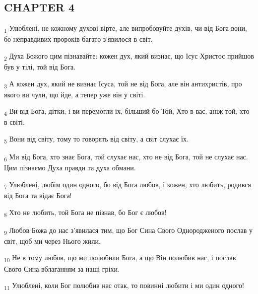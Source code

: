 \subsection{CHAPTER 4}
\begin{tcolorbox}
\textsubscript{1} Улюблені, не кожному духові вірте, але випробовуйте духів, чи від Бога вони, бо неправдивих пророків багато з'явилося в світ.
\end{tcolorbox}
\begin{tcolorbox}
\textsubscript{2} Духа Божого цим пізнавайте: кожен дух, який визнає, що Ісус Христос прийшов був у тілі, той від Бога.
\end{tcolorbox}
\begin{tcolorbox}
\textsubscript{3} А кожен дух, який не визнає Ісуса, той не від Бога, але він антихристів, про якого ви чули, що йде, а тепер уже він у світі.
\end{tcolorbox}
\begin{tcolorbox}
\textsubscript{4} Ви від Бога, дітки, і ви перемогли їх, більший бо Той, Хто в вас, аніж той, хто в світі.
\end{tcolorbox}
\begin{tcolorbox}
\textsubscript{5} Вони від світу, тому то говорять від світу, а світ слухає їх.
\end{tcolorbox}
\begin{tcolorbox}
\textsubscript{6} Ми від Бога, хто знає Бога, той слухає нас, хто не від Бога, той не слухає нас. Цим пізнаємо Духа правди та духа обмани.
\end{tcolorbox}
\begin{tcolorbox}
\textsubscript{7} Улюблені, любім один одного, бо від Бога любов, і кожен, хто любить, родився від Бога та відає Бога!
\end{tcolorbox}
\begin{tcolorbox}
\textsubscript{8} Хто не любить, той Бога не пізнав, бо Бог є любов!
\end{tcolorbox}
\begin{tcolorbox}
\textsubscript{9} Любов Божа до нас з'явилася тим, що Бог Сина Свого Однородженого послав у світ, щоб ми через Нього жили.
\end{tcolorbox}
\begin{tcolorbox}
\textsubscript{10} Не в тому любов, що ми полюбили Бога, а що Він полюбив нас, і послав Свого Сина вблаганням за наші гріхи.
\end{tcolorbox}
\begin{tcolorbox}
\textsubscript{11} Улюблені, коли Бог полюбив нас отак, то повинні любити і ми один одного!
\end{tcolorbox}
